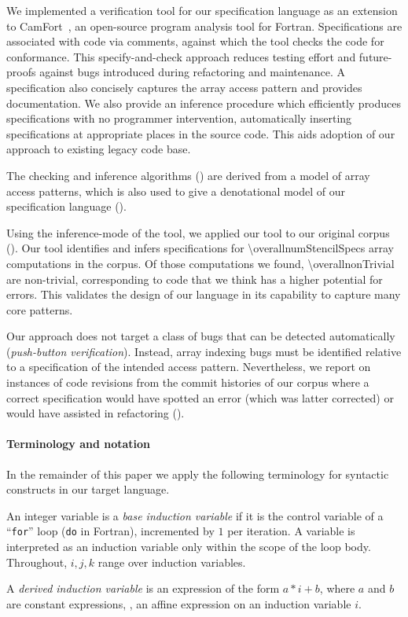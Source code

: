 We implemented a verification tool for our specification language as
an extension to CamFort~\cite{camfort}, an open-source program
analysis tool for Fortran. Specifications are associated with code via
comments, against which the tool checks the code for conformance. This
specify-and-check approach reduces testing effort and future-proofs
against bugs introduced during refactoring and maintenance. A
specification also concisely captures the array access pattern
and provides documentation. We also provide an inference procedure
which efficiently produces specifications with no programmer
intervention, automatically inserting specifications at appropriate
places in the source code. This aids adoption of our approach to
existing legacy code base.

The checking and inference algorithms () are
derived from a model of array access patterns, which is also used to
give a denotational model of our specification language
().

Using the inference-mode of the tool, we applied our tool to our
original corpus (). Our tool identifies and
infers specifications for \num{\overallnumStencilSpecs} array computations in the
corpus. Of those computations we found, \num{\overallnonTrivial} are non-trivial,
corresponding to code that we think has a higher potential for errors. This
validates the design of our language in its capability to capture many
core patterns.

Our approach does not target a class of bugs that can be detected
automatically (\emph{push-button verification}). Instead, array
indexing bugs must be identified relative to a specification of the
intended access pattern.  Nevertheless, we report on instances of code
revisions from the commit histories of our corpus where a
correct specification would have spotted an error (which was
latter corrected) or would have assisted in refactoring 
().

\paragraph{Terminology and notation}

In the remainder of this paper we apply the following terminology for syntactic constructs in our target language.

\begin{defn}
  An integer variable is a \emph{base induction variable} if it is the
  control variable of a ``\texttt{for}'' loop (\texttt{do} in
  Fortran), incremented by $1$ per iteration. A variable is
  interpreted as an induction variable only within the scope of the
  loop body. Throughout, $i, j, k$ range over induction variables.

  A \emph{derived induction variable} is an expression of the form
  $a \ast i + b$, where $a$ and $b$ are constant expressions, \ie{},
  an affine expression on an induction variable $i$.
\end{defn}

